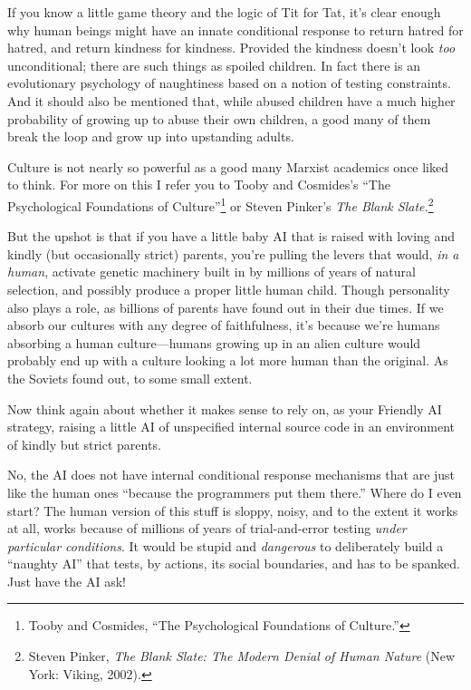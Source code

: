  If you know a little game theory and the logic of Tit for Tat,
it's clear enough why human beings might have an innate
conditional response to return hatred for hatred, and return kindness
for kindness. Provided the kindness doesn't look
\textit{too} unconditional; there are such things as spoiled children.
In fact there is an evolutionary psychology of naughtiness based on a
notion of testing constraints. And it should also be mentioned that,
while abused children have a much higher probability of growing up to
abuse their own children, a good many of them break the loop and grow
up into upstanding adults.

{
 Culture is not nearly so powerful as a good many Marxist academics
once liked to think. For more on this I refer you to Tooby and
Cosmides's ``The Psychological
Foundations of Culture''\footnote{Tooby and Cosmides, ``The Psychological
Foundations of Culture.''} or Steven
Pinker's \textit{The Blank Slate.}\footnote{Steven Pinker, \textit{The Blank Slate: The Modern Denial of
Human Nature} (New York: Viking, 2002).}}


 But the upshot is that if you have a little baby AI that is raised
with loving and kindly (but occasionally strict) parents,
you're pulling the levers that would, \textit{in a
human}, activate genetic machinery built in by millions of years of
natural selection, and possibly produce a proper little human child.
Though personality also plays a role, as billions of parents have found
out in their due times. If we absorb our cultures with any degree of
faithfulness, it's because we're humans
absorbing a human culture---humans growing up in an alien culture would
probably end up with a culture looking a lot more human than the
original. As the Soviets found out, to some small extent.


 Now think again about whether it makes sense to rely on, as your
Friendly AI strategy, raising a little AI of unspecified internal
source code in an environment of kindly but strict parents.


 No, the AI does not have internal conditional response mechanisms
that are just like the human ones ``because the
programmers put them there.'' Where do I even start?
The human version of this stuff is sloppy, noisy, and to the extent it
works at all, works because of millions of years of trial-and-error
testing \textit{under particular conditions}. It would be stupid and
\textit{dangerous} to deliberately build a ``naughty
AI'' that tests, by actions, its social boundaries,
and has to be spanked. Just have the AI ask!


